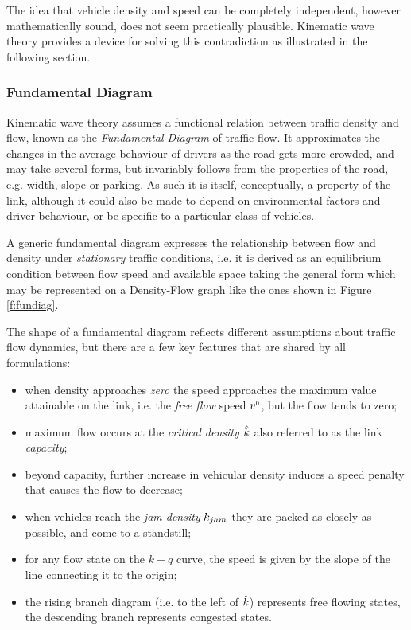 The idea that vehicle density and speed can be completely independent, however mathematically sound, does not seem practically plausible. Kinematic wave theory provides a device for solving this contradiction as illustrated in the following section.

\subsubsection{Fundamental Diagram} \label{s:fundiag}
Kinematic wave theory assumes a functional relation between traffic density and flow, known as the \emph{Fundamental Diagram} of traffic flow. It approximates the changes in the average behaviour of drivers as the road gets more crowded, and may take several forms, but invariably follows from the properties of the road, e.g. width, slope or parking. As such it is itself, conceptually, a property of the link, although it could also be made to depend on environmental factors and driver behaviour, or be specific to a particular class of vehicles.

A generic fundamental diagram expresses the relationship between flow and density under \emph{stationary} traffic conditions, i.e. it is derived as an equilibrium condition between flow speed and available space taking the general form
which may be represented on a Density-Flow graph like the ones shown in Figure \ref{f:fundiag}.

The shape of a fundamental diagram reflects different assumptions about traffic flow dynamics, but there are a few key features that are shared by all formulations:
\begin{itemize}
\item when density approaches \emph{zero} the speed approaches the maximum value attainable on the link, i.e. the \emph{free flow} speed $v^{\scriptscriptstyle{0}}$, but the flow tends to zero;
\item maximum flow occurs at the \emph{critical density $\hat{k}$} also referred to as the link \emph{capacity};
\item beyond capacity, further increase in vehicular density induces a speed penalty that causes the flow to decrease;
\item when vehicles reach the \emph{jam density} $k_{jam}$ they are packed as closely as possible, and come to a standstill;
\item for any flow state on the $k-q$ curve, the speed is given by the slope of the line connecting it to the origin;
\item the rising branch diagram (i.e. to the left of $\hat{k}$) represents free flowing 
states, the descending branch represents congested states.
\end{itemize}

